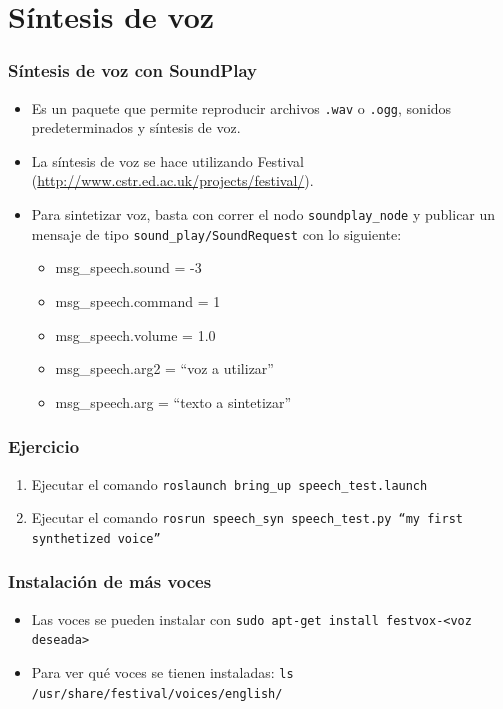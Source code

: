 \documentclass[10pt,spanish,aspectratio=1610]{beamer}
\begin{document}
\section{Síntesis de voz}
\begin{frame}\frametitle{Síntesis de voz con SoundPlay}
  \begin{itemize}
  \item Es un paquete que permite reproducir archivos \texttt{.wav} o \texttt{.ogg}, sonidos predeterminados y síntesis de voz.
  \item La síntesis de voz se hace utilizando Festival (\url{http://www.cstr.ed.ac.uk/projects/festival/}).
  \item Para sintetizar voz, basta con correr el nodo \texttt{soundplay\_node} y publicar un mensaje de tipo \texttt{sound\_play/SoundRequest} con lo siguiente:
    \begin{itemize}
    \item msg\_speech.sound   = -3                 
    \item msg\_speech.command = 1                  
    \item msg\_speech.volume  = 1.0                
    \item msg\_speech.arg2    = ``voz a utilizar''
    \item msg\_speech.arg = ``texto a sintetizar''
    \end{itemize}
  \end{itemize}
\end{frame}

\begin{frame}\frametitle{Ejercicio}
  \begin{enumerate}
  \item Ejecutar el comando \texttt{roslaunch bring\_up speech\_test.launch}
  \item Ejecutar el comando \texttt{rosrun speech\_syn speech\_test.py ``my first synthetized voice''}
  \end{enumerate}
\end{frame}

\begin{frame}\frametitle{Instalación de más voces}
  \begin{itemize}
  \item Las voces se pueden instalar con \texttt{sudo apt-get install festvox-<voz deseada>}
  \item Para ver qué voces se tienen instaladas: \texttt{ls /usr/share/festival/voices/english/}
  \end{itemize}
\end{frame}
\end{document}
